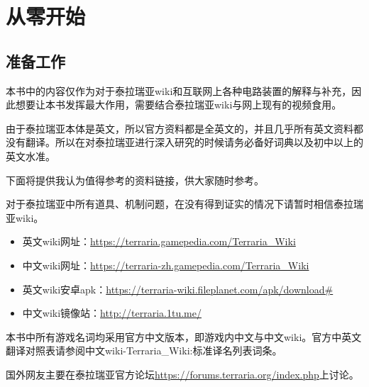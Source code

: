 \chapter{从零开始}

\section{准备工作}\label{sec1:1}

本书中的内容仅作为对于泰拉瑞亚wiki和互联网上各种电路装置的解释与补充，因此想要让本书发挥最大作用，需要结合泰拉瑞亚wiki与网上现有的视频食用。

由于泰拉瑞亚本体是英文，所以官方资料都是全英文的，并且几乎所有英文资料都没有翻译。所以在对泰拉瑞亚进行深入研究的时候请务必备好词典以及初中以上的英文水准。

下面将提供我认为值得参考的资料链接，供大家随时参考。

对于泰拉瑞亚中所有道具、机制问题，在没有得到证实的情况下请暂时相信泰拉瑞亚wiki。
\begin{itemize}
\item
英文wiki网址：\url{https://terraria.gamepedia.com/Terraria_Wiki}
\item
中文wiki网址：\url{https://terraria-zh.gamepedia.com/Terraria_Wiki}
\item
英文wiki安卓apk：\url{https://terraria-wiki.fileplanet.com/apk/download#}
\item
中文wiki镜像站：\url{http://terraria.1tu.me/}
\end{itemize}
本书中所有游戏名词均采用官方中文版本，即游戏内中文与中文wiki。官方中英文翻译对照表请参阅中文wiki-Terraria\_Wiki:标准译名列表词条。

国外网友主要在泰拉瑞亚官方论坛\url{https://forums.terraria.org/index.php}上讨论。\\


